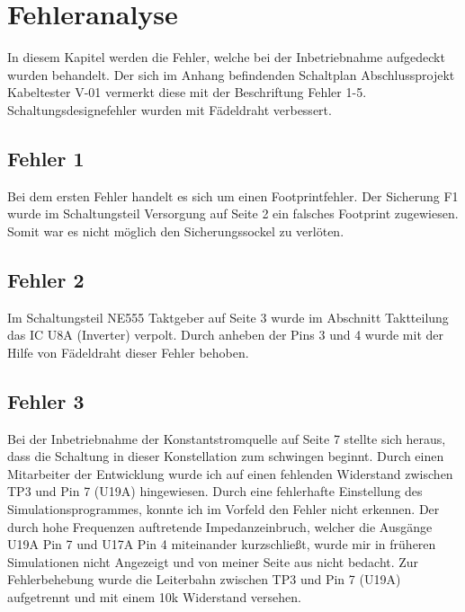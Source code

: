 \section{Fehleranalyse}


In diesem Kapitel werden die Fehler, welche bei der Inbetriebnahme aufgedeckt wurden behandelt. Der sich im Anhang befindenden Schaltplan \glqq Abschlussprojekt Kabeltester  V-01\grqq{} vermerkt diese mit der Beschriftung \glqq Fehler 1-5\grqq{}. Schaltungsdesignefehler wurden mit Fädeldraht verbessert.  




\subsection{Fehler 1}

Bei dem ersten Fehler handelt es sich um einen Footprintfehler. Der Sicherung F1 wurde im Schaltungsteil \glqq Versorgung \grqq{} auf Seite 2 ein falsches Footprint zugewiesen. Somit war es nicht möglich den Sicherungssockel zu verlöten. 


\subsection{Fehler 2}

Im Schaltungsteil \glqq NE555 Taktgeber\grqq{} auf Seite 3 wurde im Abschnitt \glqq Taktteilung\grqq{} das IC U8A (Inverter) verpolt. Durch anheben der Pins 3 und 4 wurde mit der Hilfe von Fädeldraht dieser Fehler behoben.



\subsection{Fehler 3}

Bei der Inbetriebnahme der Konstantstromquelle auf Seite 7 stellte sich heraus, dass die Schaltung in dieser Konstellation zum schwingen beginnt. Durch einen Mitarbeiter der Entwicklung wurde ich auf einen fehlenden Widerstand zwischen TP3 und Pin 7 (U19A) hingewiesen. Durch eine fehlerhafte Einstellung des Simulationsprogrammes, konnte ich im Vorfeld den Fehler nicht erkennen. Der durch hohe Frequenzen auftretende Impedanzeinbruch, welcher die Ausgänge U19A Pin 7 und U17A Pin 4 miteinander kurzschließt, wurde mir in früheren Simulationen nicht Angezeigt und von meiner Seite aus nicht bedacht. Zur Fehlerbehebung wurde die Leiterbahn zwischen TP3 und Pin 7 (U19A) aufgetrennt und mit einem 10k Widerstand versehen. 



